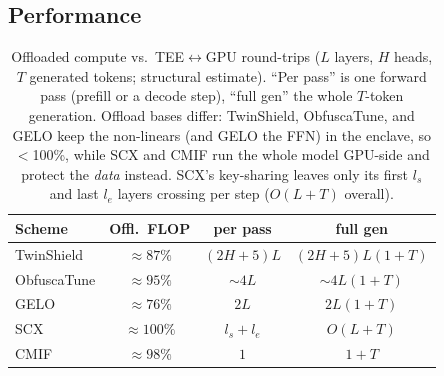 \subsection{Performance}

\begin{table}[H]
\centering
\caption{Offloaded compute vs.\ TEE$\leftrightarrow$GPU round-trips ($L$ layers, $H$ heads,
$T$ generated tokens; structural estimate). ``Per pass'' is one forward pass (prefill or a decode
step), ``full gen'' the whole $T$-token generation. Offload bases differ: TwinShield, ObfuscaTune,
and GELO keep the non-linears (and GELO the FFN) in the enclave, so $<$100\%, while SCX and CMIF run
the whole model GPU-side and protect the \emph{data} instead. SCX's key-sharing leaves only its first
$l_s$ and last $l_e$ layers crossing per step ($O(L{+}T)$ overall).}
\label{tab:roundtrips}
\footnotesize
\setlength{\tabcolsep}{3pt}
\renewcommand{\arraystretch}{1.2}
\begin{tabular*}{\columnwidth}{@{\extracolsep{\fill}}lccc@{}}
\toprule
Scheme & Offl.\ FLOP & per pass & full gen \\
\midrule
TwinShield  & ${\approx}87\%$          & $(2H{+}5)L$ & $(2H{+}5)L(1{+}T)$ \\
ObfuscaTune & ${\approx}95\%$          & ${\sim}4L$  & ${\sim}4L(1{+}T)$ \\
GELO        & ${\approx}76\%$  & $2L$        & $2L(1{+}T)$ \\
SCX         & ${\approx}100\%$         & $l_s{+}l_e$ & $O(L{+}T)$ \\
CMIF        & ${\approx}98\%$          & $1$         & $1{+}T$ \\
\bottomrule
\end{tabular*}
\end{table}


